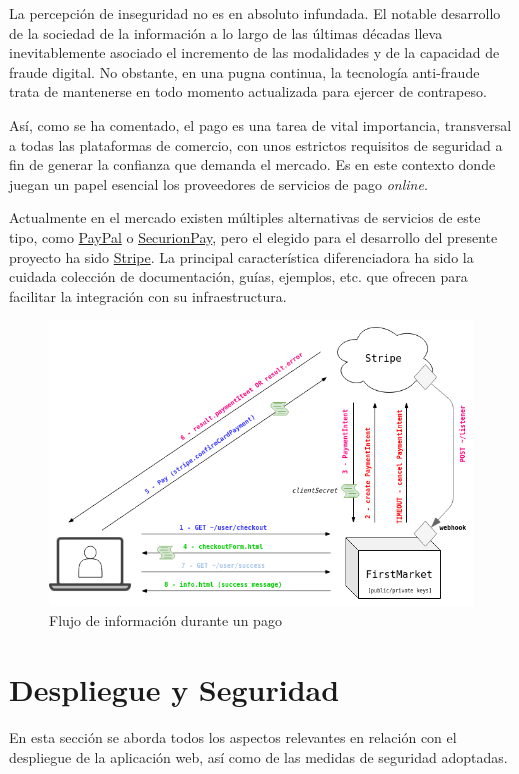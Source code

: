 \documentclass[a4paper]{article}
\begin{document}
    La percepción de inseguridad no es en absoluto infundada. El notable desarrollo de la sociedad de la información a lo largo de las últimas décadas lleva inevitablemente asociado el incremento de las modalidades y de la capacidad de fraude digital. No obstante, en una pugna continua, la tecnología anti-fraude trata de mantenerse en todo momento actualizada para ejercer de contrapeso.
    
    Así, como se ha comentado, el pago es una tarea de vital importancia, transversal a todas las plataformas de comercio, con unos estrictos requisitos de seguridad a fin de generar la confianza que demanda el mercado. Es en este contexto donde juegan un papel esencial los proveedores de servicios de pago \emph{online}.
    
    Actualmente en el mercado existen múltiples alternativas de servicios de este tipo, como \href{https://www.paypal.com/}{PayPal} o \href{https://securionpay.com/}{SecurionPay}, pero el elegido para el desarrollo del presente proyecto ha sido \href{https://stripe.com/}{Stripe}. La principal característica diferenciadora ha sido la cuidada colección de documentación, guías, ejemplos, etc. que ofrecen para facilitar la integración con su infraestructura.
    
    \begin{figure}[hbt!]
    	\centering
    	\includegraphics[width=\textwidth,keepaspectratio]{stripe}
    	\caption{Flujo de información durante un pago}
    	\label{fig:stripe}
    \end{figure}


    \section{Despliegue y Seguridad}
    En esta sección se aborda todos los aspectos relevantes en relación con el despliegue de la aplicación web, así como de las medidas de seguridad adoptadas.
\end{document}
